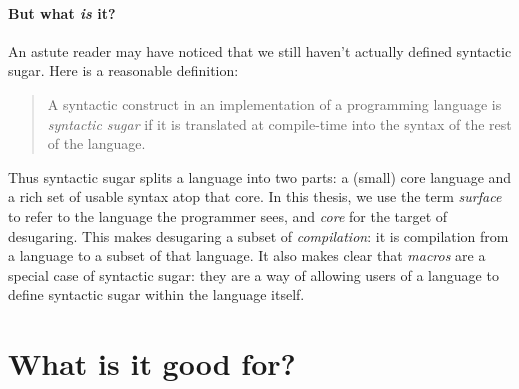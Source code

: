 \paragraph{But what \emph{is} it?}
An astute reader may have noticed that we still haven't actually
defined syntactic sugar. Here is a reasonable definition:
\begin{quote}
  A syntactic construct in an implementation of a programming language
  is \emph{syntactic sugar} if it is translated at compile-time into
  the syntax of the rest of the language.
\end{quote}
Thus syntactic sugar splits a language into two parts: a (small) core
language and a rich set of usable syntax atop that core. In this
thesis, we use the term \emph{surface} to refer to the language the
programmer sees, and \emph{core} for the target of desugaring.
This makes desugaring a subset of \emph{compilation}: it is
compilation from a language to a subset of that language. It also
makes clear that \emph{macros} are a special case of syntactic sugar:
they are a way of allowing users of a language to
define syntactic sugar within the language itself.


\section{What is it good for?}

